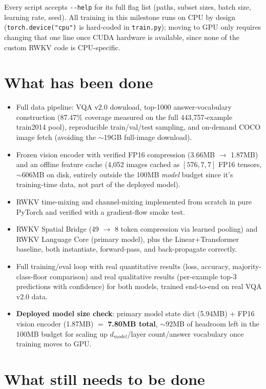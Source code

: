\documentclass[final]{article}
\begin{document}
Every script accepts \texttt{-{}-help} for its full flag list (paths, subset sizes, batch size,
learning rate, seed). All training in this milestone runs on CPU by design (\texttt{torch.device("cpu")}
is hard-coded in \texttt{train.py}); moving to GPU only requires changing that one line once
CUDA hardware is available, since none of the custom RWKV code is CPU-specific.

\section*{What has been done}

\begin{itemize}
  \item Full data pipeline: VQA v2.0 download, top-1000 answer-vocabulary construction (87.47\% coverage measured on the full 443,757-example train2014 pool), reproducible train/val/test sampling, and on-demand COCO image fetch (avoiding the $\sim$19GB full-image download).
  \item Frozen vision encoder with verified FP16 compression (3.66MB $\to$ 1.87MB) and an offline feature cache (4{,}052 images cached as $[576,7,7]$ FP16 tensors, $\sim$606MB on disk, entirely outside the 100MB \emph{model} budget since it's training-time data, not part of the deployed model).
  \item RWKV time-mixing and channel-mixing implemented from scratch in pure PyTorch and verified with a gradient-flow smoke test.
  \item RWKV Spatial Bridge (49 $\to$ 8 token compression via learned pooling) and RWKV Language Core (primary model), plus the Linear+Transformer baseline, both instantiate, forward-pass, and back-propagate correctly.
  \item Full training/eval loop with real quantitative results (loss, accuracy, majority-class-floor comparison) and real qualitative results (per-example top-3 predictions with confidence) for both models, trained end-to-end on real VQA v2.0 data.
  \item \textbf{Deployed model size check}: primary model state dict (5.94MB) + FP16 vision encoder (1.87MB) $=$ \textbf{7.80MB total}, ${\sim}92$MB of headroom left in the 100MB budget for scaling up $d_{model}$/layer count/answer vocabulary once training moves to GPU.
\end{itemize}

\section*{What still needs to be done}
\end{document}

